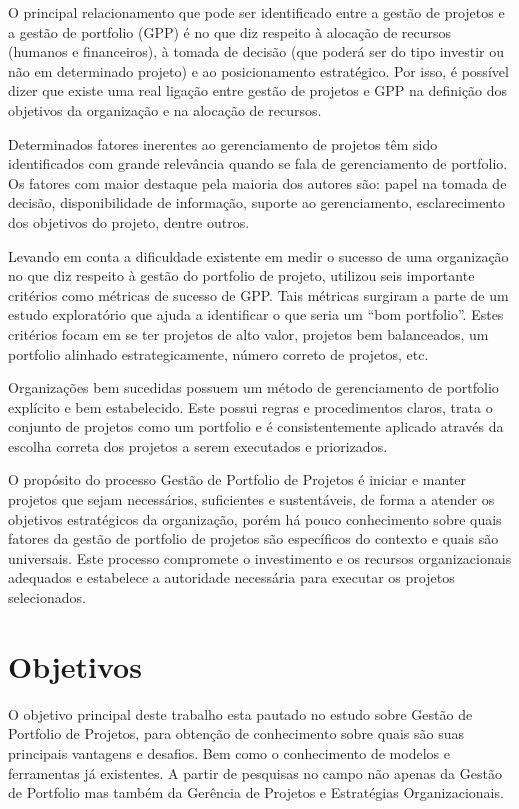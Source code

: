 \documentclass[12pt,a4paper,ruledheader,tocpage=prefix,floatnumber=continuous,pagestart=folhaderosto,font=times]{abnt}
\begin{document}
O principal relacionamento que pode ser identificado entre a gestão de projetos e a gestão de portfolio (GPP) é no que diz respeito à alocação de recursos (humanos
e financeiros), à tomada de decisão (que poderá ser do tipo investir ou não em determinado projeto) e ao posicionamento estratégico. Por isso, é possível
dizer que existe uma real ligação entre gestão de projetos e GPP na definição dos objetivos da organização e na alocação de recursos.

Determinados fatores inerentes ao gerenciamento de projetos têm sido identificados com grande relevância quando se fala de gerenciamento de portfolio. Os
fatores com maior destaque pela maioria dos autores são: papel na tomada de decisão, disponibilidade de informação, suporte ao gerenciamento, esclarecimento
dos objetivos do projeto, dentre outros.

Levando em conta a dificuldade existente em medir o sucesso de uma organização no que diz respeito à gestão do portfolio de projeto, \cite{COOPER2001} utilizou
seis importante critérios como métricas de sucesso de GPP. Tais métricas surgiram a parte de um estudo exploratório que ajuda a identificar o que seria um
``bom portfolio''. Estes critérios focam em se ter projetos de alto valor, projetos bem balanceados, um portfolio alinhado estrategicamente, número correto 
de projetos, etc.

Organizações bem sucedidas possuem um método de gerenciamento de portfolio explícito e bem estabelecido. Este possui regras e procedimentos claros, trata
o conjunto de projetos como um portfolio e é consistentemente aplicado através da escolha correta dos projetos a serem executados e priorizados.

O propósito do processo Gestão de Portfolio de Projetos é iniciar e manter projetos que sejam necessários, suficientes e sustentáveis, de forma a 
atender os objetivos estratégicos da organização, porém há pouco conhecimento sobre quais fatores da gestão de portfolio de projetos são específicos do 
contexto e quais são universais. Este processo compromete o investimento e os recursos organizacionais adequados e estabelece a autoridade necessária 
para executar os projetos selecionados.\cite{SOFTEX2007}

\section{Objetivos}
O objetivo principal deste trabalho esta pautado no estudo sobre Gestão de Portfolio de Projetos, para obtenção de conhecimento sobre quais são suas principais
vantagens e desafios. Bem como o conhecimento de modelos e ferramentas já existentes. A partir de pesquisas no campo não apenas da Gestão de Portfolio mas 
também da Gerência de Projetos e Estratégias Organizacionais.
\end{document}
